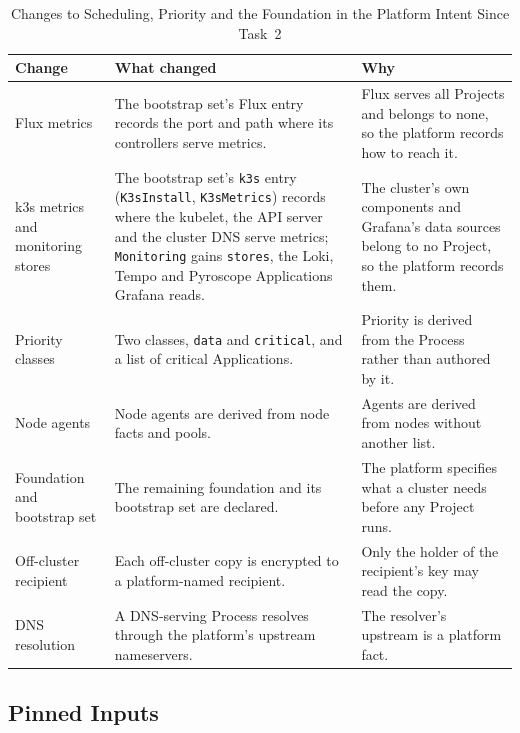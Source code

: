 \begin{table}[!htbp]
\centering
\footnotesize
\begin{tabular}{>{\raggedright\arraybackslash}p{}>{\raggedright\arraybackslash}p{}>{\raggedright\arraybackslash}p{}}
\hline
\textbf{Change} & \textbf{What changed} & \textbf{Why} \\
\hline
Flux metrics & The bootstrap set's Flux entry records the port and path where its controllers serve metrics. & Flux serves all Projects and belongs to none, so the platform records how to reach it. \\
k3s metrics and monitoring stores & The bootstrap set's \texttt{k3s} entry (\texttt{K3sInstall}, \texttt{K3sMetrics}) records where the kubelet, the API server and the cluster DNS serve metrics; \texttt{Monitoring} gains \texttt{stores}, the Loki, Tempo and Pyroscope Applications Grafana reads. & The cluster's own components and Grafana's data sources belong to no Project, so the platform records them. \\
Priority classes & Two classes, \texttt{data} and \texttt{critical}, and a list of critical Applications. & Priority is derived from the Process rather than authored by it. \\
Node agents & Node agents are derived from node facts and pools. & Agents are derived from nodes without another list. \\
Foundation and bootstrap set & The remaining foundation and its bootstrap set are declared. & The platform specifies what a cluster needs before any Project runs. \\
Off-cluster recipient & Each off-cluster copy is encrypted to a platform-named recipient. & Only the holder of the recipient's key may read the copy. \\
DNS resolution & A DNS-serving Process resolves through the platform's upstream nameservers. & The resolver's upstream is a platform fact. \\
\hline
\end{tabular}
\caption{Changes to Scheduling, Priority and the Foundation in the Platform Intent Since Task~2}
\label{tab:app-platform-3}
\end{table}

\subsection{Pinned Inputs}
\label{sec:appendix-pinned}

